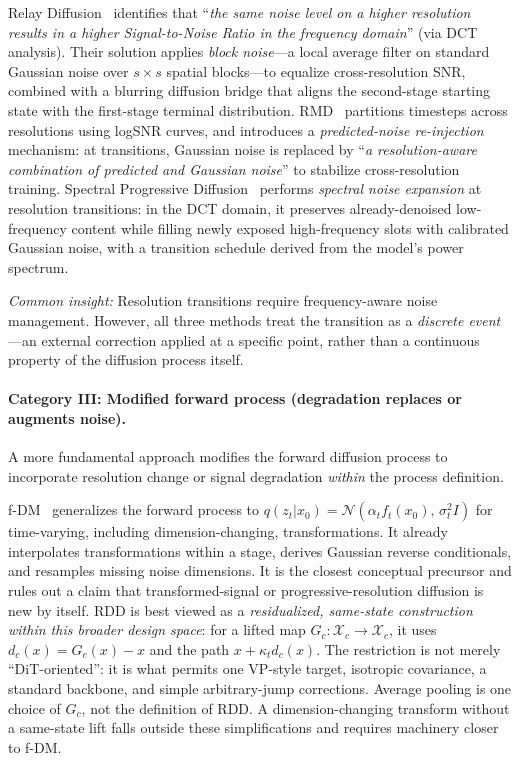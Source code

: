 \documentclass[10pt]{article}
\begin{document}
Relay Diffusion~\citep{relay_diffusion} identifies that ``\emph{the same noise level on a higher resolution results in a higher Signal-to-Noise Ratio in the frequency domain}'' (via DCT analysis).
Their solution applies \emph{block noise}---a local average filter on standard Gaussian noise over $s{\times}s$ spatial blocks---to equalize cross-resolution SNR, combined with a blurring diffusion bridge that aligns the second-stage starting state with the first-stage terminal distribution.
RMD~\citep{rmd2025} partitions timesteps across resolutions using logSNR curves, and introduces a \emph{predicted-noise re-injection} mechanism: at transitions, Gaussian noise is replaced by ``\emph{a resolution-aware combination of predicted and Gaussian noise}'' to stabilize cross-resolution training.
Spectral Progressive Diffusion~\citep{xiao2026spd} performs \emph{spectral noise expansion} at resolution transitions: in the DCT domain, it preserves already-denoised low-frequency content while filling newly exposed high-frequency slots with calibrated Gaussian noise, with a transition schedule derived from the model's power spectrum.

\emph{Common insight:} Resolution transitions require frequency-aware noise management. However, all three methods treat the transition as a \emph{discrete event}---an external correction applied at a specific point, rather than a continuous property of the diffusion process itself.

\paragraph{Category III: Modified forward process (degradation replaces or augments noise).}
A more fundamental approach modifies the forward diffusion process to incorporate resolution change or signal degradation \emph{within} the process definition.

f-DM~\citep{gu2022fdm} generalizes the forward process to $q(z_t|x_0) = \mathcal{N}(\alpha_t f_t(x_0),\, \sigma_t^2 I)$ for time-varying, including dimension-changing, transformations. It already interpolates transformations within a stage, derives Gaussian reverse conditionals, and resamples missing noise dimensions. It is the closest conceptual precursor and rules out a claim that transformed-signal or progressive-resolution diffusion is new by itself.
RDD is best viewed as a \emph{residualized, same-state construction within this broader design space}: for a lifted map $G_c:\mathcal X_c\to\mathcal X_c$, it uses $d_c(x)=G_c(x)-x$ and the path $x+\kappa_t d_c(x)$. The restriction is not merely ``DiT-oriented'': it is what permits one VP-style target, isotropic covariance, a standard backbone, and simple arbitrary-jump corrections. Average pooling is one choice of $G_c$, not the definition of RDD. A dimension-changing transform without a same-state lift falls outside these simplifications and requires machinery closer to f-DM.
\end{document}
